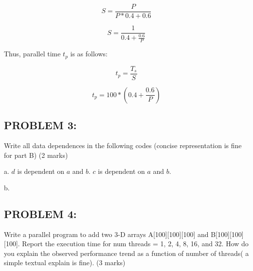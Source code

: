 \documentclass[12pt,letterpaper]{article}
\begin{document}
\[ S = \frac{P}{P * 0.4 + 0.6} \]

\[ S = \frac{1}{ 0.4 + \frac{0.6}{P}} \]

Thus, parallel time \(t_p\) is as follows:

\[ t_p = \frac{T_s}{S} \]

\[ t_p = 100 * (0.4 + \frac{0.6}{P}) \]

\pagebreak


\subsection*{PROBLEM 3:}
Write all data dependences in the following codes (concise representation is fine for 
part B) (2 marks)

\hline

a. \(d\) is dependent on \(a\) and \(b\). \(c\) is dependent on \(a\) and \(b\).

b. 

\pagebreak


\subsection*{PROBLEM 4:}
Write a parallel program to add two 3-D arrays A[100][100][100] and B[100][100][100]. 
Report the execution time for num threads = 1, 2, 4, 8, 16, and 32. How do you explain 
the observed performance trend as a function of number of threads( a simple textual 
explain is fine). (3 marks)

\hline
\end{document}
